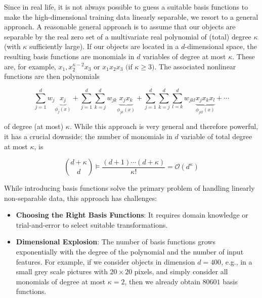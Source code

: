 \begin{example}
Since in real life, it is not always possible to guess a suitable basis functions to make the high-dimensional training data linearly separable, we resort to a general approach. A reasonable general approach is to assume that our objects are separable by the real zero set of a multivariate real polynomial of (total) degree $\kappa$ (with $\kappa$ sufficiently large). If our objects are located in a $d$-dimensional space, the resulting basis functions are monomials in $d$ variables of degree at most $\kappa$. These are, for example, $x_1, x_2^{\kappa-2}x_3 \text{ or } x_1x_2x_3 \text{ (if }\kappa \geq 3\text{)}$. The associated nonlinear functions are then polynomials

\begin{equation}
    \sum_{j=1}^{d} w_j \underbrace{x_j}_{\phi_j(x)} + 
    \sum_{j=1}^{d} \sum_{k=j}^{d} w_{jk} \underbrace{x_j x_k}_{\phi_{jk}(x)} + 
    \sum_{j=1}^{d} \sum_{k=j}^{d} \sum_{l=k}^{d} w_{jkl} \underbrace{x_j x_k x_l}_{\phi_{jkl}(x)} + \cdots
    \label{eqn:27}
\end{equation}

of degree (at most) $\kappa$. While this approach is very general and therefore powerful, it has a crucial downside: the number of monomials in $d$ variable of total degree at most $\kappa$, is

\begin{equation}
    \binom{d+\kappa}{d} \models \frac{(d+1) \cdots (d+\kappa)}{\kappa!} = \mathcal{O}(d^{\kappa})
    \label{eqn:28}
\end{equation}
\end{example}

While introducing basis functions solve the primary problem of handling linearly non-separable data, this approach has challenges:
\begin{itemize}
    \item \textbf{Choosing the Right Basis Functions}: It requires domain knowledge or trial-and-error to select suitable transformations.
    \item \textbf{Dimensional Explosion}: The number of basis functions grows exponentially with the degree of the polynomial and the number of input features. For example, if we consider objects in dimension $d = 400$, e.g., in a small grey scale pictures with $20 \times 20$ pixels, and simply consider all monomials of degree at most $\kappa = 2$, then we already obtain $80601$ basis functions.\cite{hastie2009elements}
\end{itemize}

